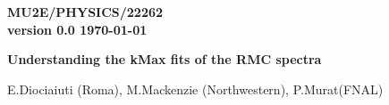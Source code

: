\documentclass[12pt]{article}
\begin{document}
\begin{titlepage}
  \begin{flushright}
    \bf {MU2E/PHYSICS/22262} \\
    version 0.0
    \today
  \end{flushright}

  \vspace{1cm}
  
  \begin{center}
    {\Large \bf Understanding the kMax fits of the RMC spectra} 
    
    \vspace{1cm}
    
    E.Diociaiuti (Roma), M.Mackenzie (Northwestern), P.Murat(FNAL)
    
    \vspace{0.3cm}
    
    \vspace{0.8cm}                           
  \end{center}

  \begin{abstract}
    
    This note summarizes our effort on understanding the kMax fits of the RMC spectra.

    Mistakes and other internal inconsistencies found in the literature make
    it difficult to rely on the results of other experiments when predicting RMC
    background to the search of mu- -->e+ conversion process.
    
    To reliably predict RMC background to mu- --> e+, Mu2e needs to have its own
    measurement of the endpoint of the RMC photon spectrum on Al.
    
  \end{abstract}

\end{titlepage}
%
%
%
{\tableofcontents}

\end{document}
